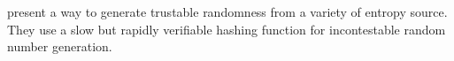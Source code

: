\item[A Random Zoo: sloth, unicorn \& trx]
\citet*{lenstra2015random} present a way to generate trustable randomness from a variety of entropy source. They use a slow but rapidly verifiable hashing function for incontestable random number generation.
